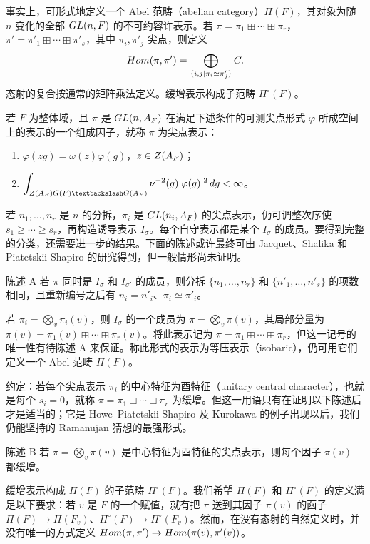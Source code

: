 事实上，可形式地定义一个 Abel 范畴（abelian category）$\Pi(F)$，其对象为随
$n$ 变化的全部 $GL(n,F)$ 的不可约容许表示。若
$\pi=\pi_1\boxplus\cdots\boxplus\pi_r$，
$\pi'=\pi'_1\boxplus\cdots\boxplus\pi'_s$，其中 $\pi_i,\pi'_j$ 尖点，则定义
\[
Hom(\pi,\pi')=\bigoplus_{\{i,j\mid\pi_i\simeq\pi'_j\}}C.
\]
态射的复合按通常的矩阵乘法定义。缓增表示构成子范畴 $\Pi^\circ(F)$。

若 $F$ 为整体域，且 $\pi$ 是 $GL(n,A_F)$ 在满足下述条件的可测尖点形式 $\varphi$ 所成空间上的表示的一个组成因子，就称 $\pi$ 为尖点表示：
\begin{enumerate}
\item[(a)] $\varphi(zg)=\omega(z)\varphi(g)$，$z\in Z(A_F)$；
\item[(b)] $\displaystyle\int_{Z(\A_F)G(F)\backslash G(\A_F)}\nu^{-2}(g)|\varphi(g)|^2\,dg<\infty$。
\end{enumerate}
若 $n_1,\ldots,n_r$ 是 $n$ 的分拆，$\pi_i$ 是 $GL(n_i,A_F)$ 的尖点表示，仍可调整次序使
$s_1\ge\cdots\ge s_r$，再构造诱导表示 $I_\sigma$。每个自守表示都是某个
$I_\sigma$ 的成员。要得到完整的分类，还需要进一步的结果。下面的陈述或许最终可由
Jacquet、Shalika 和 Piatetskii-Shapiro 的研究得到，但一般情形尚未证明。

\begin{originaltheorem}{陈述 A}
若 $\pi$ 同时是 $I_\sigma$ 和 $I_{\sigma'}$ 的成员，则分拆
$\{n_1,\ldots,n_r\}$ 和 $\{n'_1,\ldots,n'_s\}$ 的项数相同，且重新编号之后有
$n_i=n'_i$、$\pi_i\simeq\pi'_i$。
\end{originaltheorem}

若 $\pi_i=\bigotimes_v\pi_i(v)$，则 $I_\sigma$ 的一个成员为
$\pi=\bigotimes_v\pi(v)$，其局部分量为
$\pi(v)=\pi_1(v)\boxplus\cdots\boxplus\pi_r(v)$。将此表示记为
$\pi=\pi_1\boxplus\cdots\boxplus\pi_r$，但这一记号的唯一性有待陈述 A 来保证。称此形式的表示为等压表示（isobaric），仍可用它们定义一个 Abel 范畴 $\Pi(F)$。

约定：若每个尖点表示 $\pi_i$ 的中心特征为酉特征（unitary central character），也就是每个
$s_i=0$，就称 $\pi=\pi_1\boxplus\cdots\boxplus\pi_r$ 为缓增。但这一用语只有在证明以下陈述后才是适当的；它是 Howe--Piatetskii-Shapiro 及 Kurokawa 的例子出现以后，我们仍能坚持的 Ramanujan 猜想的最强形式。

\begin{originaltheorem}{陈述 B}
若 $\pi=\bigotimes_v\pi(v)$ 是中心特征为酉特征的尖点表示，则每个因子 $\pi(v)$ 都缓增。
\end{originaltheorem}

缓增表示构成 $\Pi(F)$ 的子范畴 $\Pi^\circ(F)$。我们希望 $\Pi(F)$ 和 $\Pi^\circ(F)$ 的定义满足以下要求：若 $v$ 是 $F$ 的一个赋值，就有把 $\pi$ 送到其因子
$\pi(v)$ 的函子
$\Pi(F)\to\Pi(F_v)$、$\Pi^\circ(F)\to\Pi^\circ(F_v)$。然而，在没有态射的自然定义时，并没有唯一的方式定义
$Hom(\pi,\pi')\to Hom(\pi(v),\pi'(v))$。

